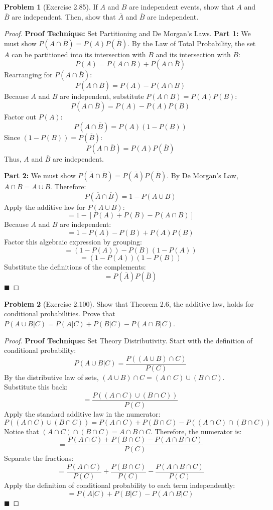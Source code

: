 \documentclass[11pt, letterpaper]{article}
\theoremstyle{definition}
\newtheorem{problem}{Problem}
\begin{document}
\vspace{0.5cm}

\begin{problem}[Exercise 2.85]
If $A$ and $B$ are independent events, show that $A$ and $\overline{B}$ are independent. Then, show that $\overline{A}$ and $\overline{B}$ are independent.
\end{problem}
\begin{proof}
\textbf{Proof Technique:} Set Partitioning and De Morgan's Laws.
\textbf{Part 1:} We must show $P(A \cap \overline{B}) = P(A)P(\overline{B})$.
By the Law of Total Probability, the set $A$ can be partitioned into its intersection with $B$ and its intersection with $\overline{B}$:
\[ P(A) = P(A \cap B) + P(A \cap \overline{B}) \]
Rearranging for $P(A \cap \overline{B})$:
\[ P(A \cap \overline{B}) = P(A) - P(A \cap B) \]
Because $A$ and $B$ are independent, substitute $P(A \cap B) = P(A)P(B)$:
\[ P(A \cap \overline{B}) = P(A) - P(A)P(B) \]
Factor out $P(A)$:
\[ P(A \cap \overline{B}) = P(A)(1 - P(B)) \]
Since $(1 - P(B)) = P(\overline{B})$:
\[ P(A \cap \overline{B}) = P(A)P(\overline{B}) \]
Thus, $A$ and $\overline{B}$ are independent.

\textbf{Part 2:} We must show $P(\overline{A} \cap \overline{B}) = P(\overline{A})P(\overline{B})$.
By De Morgan's Law, $\overline{A} \cap \overline{B} = \overline{A \cup B}$. Therefore:
\[ P(\overline{A} \cap \overline{B}) = 1 - P(A \cup B) \]
Apply the additive law for $P(A \cup B)$:
\[ = 1 - [P(A) + P(B) - P(A \cap B)] \]
Because $A$ and $B$ are independent:
\[ = 1 - P(A) - P(B) + P(A)P(B) \]
Factor this algebraic expression by grouping:
\[ = (1 - P(A)) - P(B)(1 - P(A)) \]
\[ = (1 - P(A))(1 - P(B)) \]
Substitute the definitions of the complements:
\[ = P(\overline{A})P(\overline{B}) \]
$\blacksquare$
\end{proof}

\vspace{0.5cm}

\begin{problem}[Exercise 2.100]
Show that Theorem 2.6, the additive law, holds for conditional probabilities. Prove that $P(A \cup B | C) = P(A|C) + P(B|C) - P(A \cap B | C)$.
\end{problem}
\begin{proof}
\textbf{Proof Technique:} Set Theory Distributivity.
Start with the definition of conditional probability:
\[ P(A \cup B | C) = \frac{P((A \cup B) \cap C)}{P(C)} \]
By the distributive law of sets, $(A \cup B) \cap C = (A \cap C) \cup (B \cap C)$. Substitute this back:
\[ = \frac{P((A \cap C) \cup (B \cap C))}{P(C)} \]
Apply the standard additive law in the numerator:
\[ P((A \cap C) \cup (B \cap C)) = P(A \cap C) + P(B \cap C) - P((A \cap C) \cap (B \cap C)) \]
Notice that $(A \cap C) \cap (B \cap C) = A \cap B \cap C$. Therefore, the numerator is:
\[ = \frac{P(A \cap C) + P(B \cap C) - P(A \cap B \cap C)}{P(C)} \]
Separate the fractions:
\[ = \frac{P(A \cap C)}{P(C)} + \frac{P(B \cap C)}{P(C)} - \frac{P(A \cap B \cap C)}{P(C)} \]
Apply the definition of conditional probability to each term independently:
\[ = P(A|C) + P(B|C) - P(A \cap B | C) \]
$\blacksquare$
\end{proof}
\end{document}
